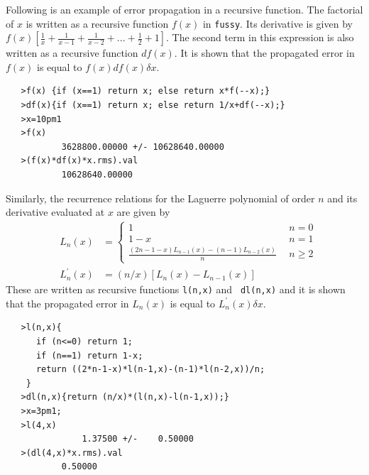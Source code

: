\documentclass[acmtoms,acmnow]{acmtrans2m}
\newcommand{\Fussy}{{\tt fussy}}
\begin{document}
Following is an example of error propagation in a recursive function.
The factorial of $x$ is written as a recursive function $f(x)$ in
\Fussy.  Its derivative is given by $f(x)\left[\frac{1}{x} +
\frac{1}{x-1} + \frac{1}{x-2} +...+
\frac{1}{2} + 1\right]$.  The second term in this
expression is also written as a recursive function $df(x)$.  It is
shown that the propagated error in $f(x)$ is equal to
$f(x)df(x)\delta x$.
\begin{verbatim}
   >f(x) {if (x==1) return x; else return x*f(--x);}
   >df(x){if (x==1) return x; else return 1/x+df(--x);}
   >x=10pm1
   >f(x)
           3628800.00000 +/- 10628640.00000
   >(f(x)*df(x)*x.rms).val
           10628640.00000
\end{verbatim}

Similarly, the recurrence relations for the Laguerre polynomial of
order $n$ and its derivative evaluated at $x$ are given by
\begin{eqnarray}
&L_n(x)& = \left\{
	\begin{array}{lr}
	1&~~n=0\\
	1-x&~~n=1\\
	\frac{(2n-1-x)L_{n-1}(x)-(n-1)L_{n-2}(x)}{n}&~~n\ge2
	\end{array}
	\right. \\
&L^\prime_n(x)&  = (n/x)\left[L_n(x) - L_{n-1}(x)\right]
\end{eqnarray}
These are written as recursive functions {\tt l(n,x)} and {\tt
dl(n,x)} and it is shown that the propagated error in $L_n(x)$ is
equal to $L^\prime_n(x)\delta x$.
\begin{verbatim}
   >l(n,x){
      if (n<=0) return 1;
      if (n==1) return 1-x;
      return ((2*n-1-x)*l(n-1,x)-(n-1)*l(n-2,x))/n;
    }
   >dl(n,x){return (n/x)*(l(n,x)-l(n-1,x));}
   >x=3pm1;
   >l(4,x)
               1.37500 +/-    0.50000
   >(dl(4,x)*x.rms).val
           0.50000
\end{verbatim}

\appendix       
\end{document}
